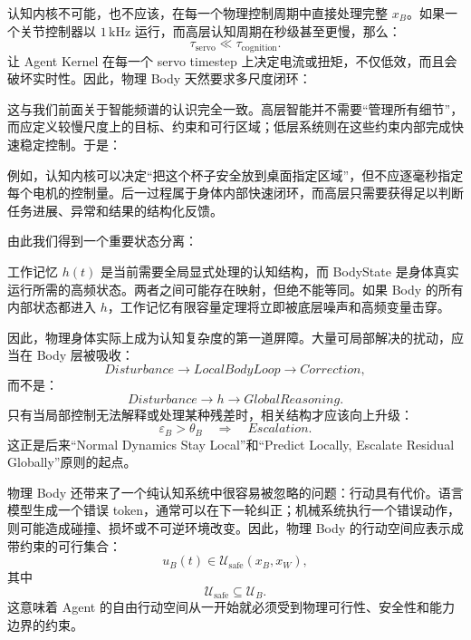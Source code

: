 认知内核不可能，也不应该，在每一个物理控制周期中直接处理完整 $x_B$。如果一个关节控制器以 $1\,\mathrm{kHz}$ 运行，而高层认知周期在秒级甚至更慢，那么：
\[
\tau_{\mathrm{servo}}
\ll
\tau_{\mathrm{cognition}}.
\]
让 Agent Kernel 在每一个 servo timestep 上决定电流或扭矩，不仅低效，而且会破坏实时性。因此，物理 Body 天然要求多尺度闭环：
\begin{statementbox}
\centering
{}
\end{statementbox}

这与我们前面关于智能频谱的认识完全一致。高层智能并不需要“管理所有细节”，而应定义较慢尺度上的目标、约束和可行区域；低层系统则在这些约束内部完成快速稳定控制。于是：
\begin{statementbox}
\centering
{}
\end{statementbox}
例如，认知内核可以决定“把这个杯子安全放到桌面指定区域”，但不应逐毫秒指定每个电机的控制量。后一过程属于身体内部快速闭环，而高层只需要获得足以判断任务进展、异常和结果的结构化反馈。

由此我们得到一个重要状态分离：
\begin{statementbox}
\centering
{}
\end{statementbox}
工作记忆 $h(t)$ 是当前需要全局显式处理的认知结构，而 BodyState 是身体真实运行所需的高频状态。两者之间可能存在映射，但绝不能等同。如果 Body 的所有内部状态都进入 $h$，工作记忆有限容量定理将立即被底层噪声和高频变量击穿。

因此，物理身体实际上成为认知复杂度的第一道屏障。大量可局部解决的扰动，应当在 Body 层被吸收：
\[
Disturbance
\rightarrow
LocalBodyLoop
\rightarrow
Correction,
\]
而不是：
\[
Disturbance
\rightarrow
h
\rightarrow
GlobalReasoning.
\]
只有当局部控制无法解释或处理某种残差时，相关结构才应该向上升级：
\[
\varepsilon_B
>
\theta_B
\quad\Rightarrow\quad
Escalation.
\]
这正是后来“Normal Dynamics Stay Local”和“Predict Locally, Escalate Residual Globally”原则的起点。

物理 Body 还带来了一个纯认知系统中很容易被忽略的问题：行动具有代价。语言模型生成一个错误 token，通常可以在下一轮纠正；机械系统执行一个错误动作，则可能造成碰撞、损坏或不可逆环境改变。因此，物理 Body 的行动空间应表示成带约束的可行集合：
\[
u_B(t)
\in
\mathcal U_{\mathrm{safe}}
\left(
x_B,
x_W
\right),
\]
其中
\[
\mathcal U_{\mathrm{safe}}
\subseteq
\mathcal U_B.
\]
这意味着 Agent 的自由行动空间从一开始就必须受到物理可行性、安全性和能力边界的约束。

